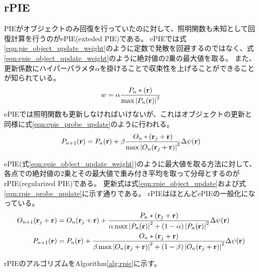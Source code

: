 \subsection{rPIE}
PIEがオブジェクトのみ回復を行っていたのに対して、照明関数も未知として回復計算を行うのがePIE(exteded PIE)である。
ePIEでは式\ref{eqn:pie_object_update_weight}のように定数で発散を回避するのではなく、式\ref{eqn:epie_object_update_weight}のように絶対値の2乗の最大値を取る。
また、更新係数にハイパーパラメタ$\alpha$を掛けることで収束性を上げることができることが知られている。
\begin{equation}
  \label{eqn:epie_object_update_weight}
  w = \alpha \frac{P_n*(\mathbf{r})}{\max \left| P_n(\mathbf{r}) \right|^2}
\end{equation}
ePIEでは照明関数も更新しなければいけないが、これはオブジェクトの更新と同様に式\ref{eqn:epie_probe_update}のように行われる。
\begin{equation}
\label{eqn:epie_probe_update}
  P_{n+1}(\mathbf{r}) 
  = P_n(\mathbf{r}) 
  + \beta \frac{O_n*(\mathbf{r}_j + \mathbf{r})}{\max \left| O_n(\mathbf{r}_j + \mathbf{r}) \right|^2} \Delta\psi(\mathbf{r})
\end{equation}

ePIE(式\ref{eqn:epie_object_update_weight})のように最大値を取る方法に対して、各点での絶対値の2乗とその最大値で重み付き平均を取って分母とするのがrPIE(regularized PIE)である。
更新式は式\ref{eqn:rpie_object_update}および式\ref{eqn:rpie_probe_update}に示す通りである。
rPIEはほとんどePIEの一般化になっている。
\begin{eqnarray}
  O_{n+1}(\mathbf{r}_j + \mathbf{r}) &= O_n(\mathbf{r}_j + \mathbf{r}) 
    + \frac{P_n*(\mathbf{r}_j + \mathbf{r})}
      {\alpha \max \left| P_n(\mathbf{r}) \right|^2 + (1-\alpha) \left| P_n(\mathbf{r}) \right|^2}
    \Delta\psi(\mathbf{r}) \label{eqn:rpie_object_update} \\
  P_{n+1}(\mathbf{r}) &= P_n(\mathbf{r}) 
    + \frac{O_n*(\mathbf{r}_j + \mathbf{r})}
      {\beta \max \left| O_n(\mathbf{r}_j + \mathbf{r}) \right|^2 + (1-\beta) \left| O_n(\mathbf{r}_j + \mathbf{r}) \right|^2}
    \Delta\psi(\mathbf{r}) \label{eqn:rpie_probe_update}
\end{eqnarray}

rPIEのアルゴリズムをAlgorithm\ref{alg:rpie}に示す。

